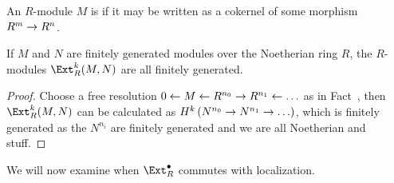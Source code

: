 \documentclass[a4paper,parskip=half,numbers=enddot, DIV=12]{scrreprt}
\begin{document}
\begin{defi}
	An $R$-module $M$ is  if it may be written as a cokernel of some morphism $R^m\morphism R^n$.
\end{defi}
\begin{fact}
	If $M$ and $N$ are finitely generated modules over the Noetherian ring $R$, the $R$-modules $\Ext_R^k(M,N)$ are all finitely generated.
\end{fact}
\begin{proof}
	Choose a free resolution $0\lmorphism M\lmorphism R^{n_0}\morphism R^{n_1}\lmorphism\ldots$ as in Fact~, then $\Ext_R^k(M,N)$ can be calculated as $H^k\left(N^{n_0}\morphism N^{n_1}\morphism\ldots\right)$, which is finitely generated as the $N^{n_i}$ are finitely generated and we are all Noetherian and stuff.
\end{proof}
We will now examine when $\Ext_R^\bullet$ commutes with localization.
\end{document}
